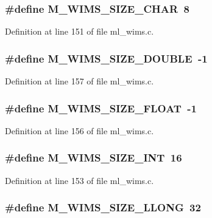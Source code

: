 \subsubsection{\setlength{\rightskip}{0pt plus 5cm}\#define M\_\-WIMS\_\-SIZE\_\-CHAR~8}\label{ml__wims_8c_b69fc61a84e79b1a0b5becb0f0154546}




Definition at line 151 of file ml\_\-wims.c.
\subsubsection{\setlength{\rightskip}{0pt plus 5cm}\#define M\_\-WIMS\_\-SIZE\_\-DOUBLE~-1}\label{ml__wims_8c_449cf8c59d50a0da679eb534e0f7f31a}




Definition at line 157 of file ml\_\-wims.c.
\subsubsection{\setlength{\rightskip}{0pt plus 5cm}\#define M\_\-WIMS\_\-SIZE\_\-FLOAT~-1}\label{ml__wims_8c_d8f19fcb2e0fa99167d71432d0d2f868}




Definition at line 156 of file ml\_\-wims.c.
\subsubsection{\setlength{\rightskip}{0pt plus 5cm}\#define M\_\-WIMS\_\-SIZE\_\-INT~16}\label{ml__wims_8c_b852654410a8ab2a76381ef7f816c963}




Definition at line 153 of file ml\_\-wims.c.
\subsubsection{\setlength{\rightskip}{0pt plus 5cm}\#define M\_\-WIMS\_\-SIZE\_\-LLONG~32}\label{ml__wims_8c_2f02c82d9f26ae5089fd5fd9e88f2f5a}




